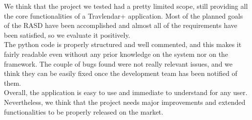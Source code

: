We think that the project we tested had a pretty limited scope, still providing all the core functionalities of a Travlendar+ application. Most of the planned goals of the RASD have been accomplished and almost all of the requirements have been satisfied, so we evaluate it positively. \\
The python code is properly structured and well commented, and this makes it fairly readable even without any prior knowledge on the system nor on the framework. The couple of bugs found were not really relevant issues, and we think they can be easily fixed once the development team has been notified of them. \\
Overall, the application is easy to use and immediate to understand for any user. Nevertheless, we think that the project needs major improvements and extended functionalities to be properly released on the market.